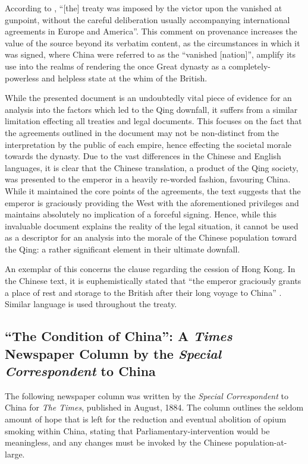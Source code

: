 \documentclass{article}
\begin{document}
According to
\autocite{Hsu:1999}, ``[the] treaty was imposed by the victor upon the vanished at gunpoint, without the careful deliberation usually accompanying international agreements in Europe and America''. This comment on provenance increases the value of the source beyond its verbatim content, as the circumstances in which it was signed, where China were referred to as the ``vanished [nation]'', amplify its use into the realms of rendering the once Great dynasty as a completely-powerless and helpless state at the whim of the British.

While the presented document is an undoubtedly vital piece of evidence for an analysis into the factors which led to the Qing downfall, it suffers from a similar limitation effecting all treaties and legal documents. This focuses on the fact that the agreements outlined in the document may not be non-distinct from the interpretation by the public of each empire, hence effecting the societal morale towards the dynasty. Due to the vast differences in the Chinese and English languages, it is clear that the Chinese translation, a product of the Qing society, was presented to the emperor in a heavily re-worded fashion, favouring China. While it maintained the core points of the agreements, the text suggests that the emperor is graciously providing the West with the aforementioned privileges and maintains absolutely no implication of a forceful signing. Hence, while this invaluable document explains the reality of the legal situation, it cannot be used as a descriptor for an analysis into the morale of the Chinese population toward the Qing: a rather significant element in their ultimate downfall.

An exemplar of this concerns the clause regarding the cession of Hong Kong. In the Chinese text, it is euphemistically stated that ``the emperor graciously grants a place of rest and storage to the British after their long voyage to China''
\autocite{Zhang:2007}. Similar language is used throughout the treaty.

\subsection{``The Condition of China'': A \textit{Times} Newspaper Column by the \textit{Special Correspondent} to China}

The following newspaper column was written by the \textit{Special Correspondent} to China for \textit{The Times}, published in August, 1884. The column outlines the seldom amount of hope that is left for the reduction and eventual abolition of opium smoking within China, stating that Parliamentary-intervention would be meaningless, and any changes must be invoked by the Chinese population-at-large.
\end{document}
